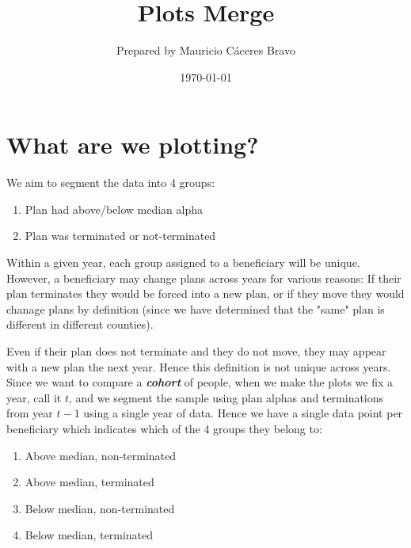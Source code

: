 \documentclass{article}
\title{\bfseries Plots Merge}
\author{\sffamily Prepared by Mauricio C\'aceres Bravo}
\date{\sffamily \today}
\begin{document}
\displayoptions
\clearpage

\section{What are we plotting?}
\label{sec:what_are_we_plotting_}

We aim to segment the data into 4 groups:
\begin{enumerate}
  \item Plan had above/below median alpha
  \item Plan was terminated or not-terminated
\end{enumerate}

Within a given year, each group assigned to a beneficiary will be
unique.  However, a beneficiary may change plans across years for
various reasons: If their plan terminates they would be forced into a
new plan, or if they move they would chanage plans by definition (since
we have determined that the "same" plan is different in different
counties).

Even if their plan does not terminate and they do not move, they may
appear with a new plan the next year. Hence this definition is not
unique across years. Since we want to compare a \textbf{\textit{cohort}}
of people, when we make the plots we fix a year, call it $t$, and we
segment the sample using plan alphas and terminations from year $t - 1$
using a single year of data. Hence we have a single data point per
beneficiary which indicates which of the 4 groups they belong to:
\begin{enumerate}[label=Group \arabic*:, leftmargin = 6em]
  \item Above median, non-terminated
  \item Above median, terminated
  \item Below median, non-terminated
  \item Below median, terminated
\end{enumerate}
\end{document}
